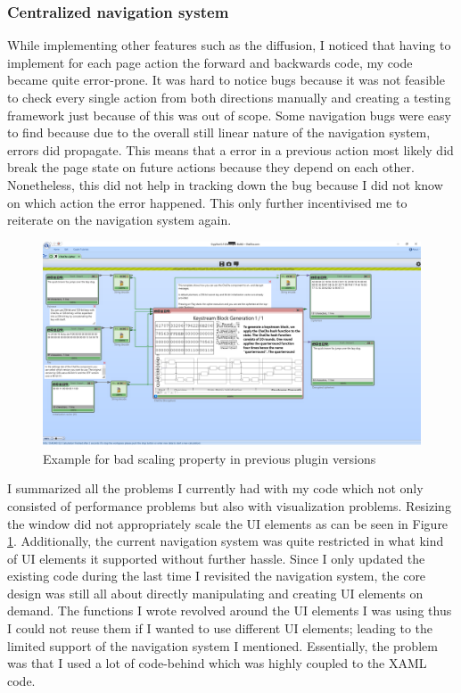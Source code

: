 \subsubsection{Centralized navigation system}

While implementing other features such as the diffusion, I noticed that having to implement for each page action the forward and backwards code, my code became quite error-prone. It was hard to notice bugs because it was not feasible to check every single action from both directions manually and creating a testing framework just because of this was out of scope. Some navigation bugs were easy to find because due to the overall still linear nature of the navigation system, errors did propagate. This means that a error in a previous action most likely did break the page state on future actions because they depend on each other. Nonetheless, this did not help in tracking down the bug because I did not know on which action the error happened. This only further incentivised me to reiterate on the navigation system again.

\begin{figure}
\caption{Example for bad scaling property in previous plugin versions}
\label{plugin.scaling.bug}
\includegraphics[width=\textwidth]{figures/scaling-bug-example.png}
\end{figure}

I summarized all the problems I currently had with my code which not only consisted of performance problems but also with visualization problems. Resizing the window did not appropriately scale the UI elements as can be seen in Figure \ref{plugin.scaling.bug}. Additionally, the current navigation system was quite restricted in what kind of UI elements it supported without further hassle. Since I only updated the existing code during the last time I revisited the navigation system, the core design was still all about directly manipulating and creating UI elements on demand. The functions I wrote revolved around the UI elements I was using thus I could not reuse them if I wanted to use different UI elements; leading to the limited support of the navigation system I mentioned. Essentially, the problem was that I used a lot of code-behind which was highly coupled to the XAML code.

